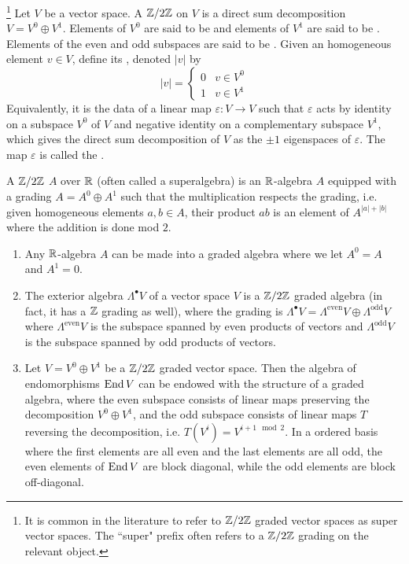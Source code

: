 \begin{defn}\footnote{It is common in the literature to refer to $\mathbb{Z}/2\mathbb{Z}$
graded vector spaces as super vector spaces. The ``super" prefix often refers
to a $\mathbb{Z}/2\mathbb{Z}$ grading on the relevant object.}
Let $V$ be a vector space. A $\mathbb{Z} /2\mathbb{Z}$  on $V$ is a direct sum
decomposition $V = V^0 \oplus V^1$. Elements of $V^0$ are said to be 
and elements of $V^1$ are said to be . Elements of the even and odd
subspaces are said to be . Given an homogeneous element
$v \in V$, define its , denoted $|v|$ by
\[
|v| = \begin{cases}
0 & v \in V^0 \\
1 & v \in V^1
\end{cases}
\]
Equivalently, it is the data of a linear map
$\varepsilon : V \to V$ such that $\varepsilon$ acts by identity on a subspace $V^0$
of $V$ and negative identity on a complementary subspace $V^1$, which gives the
direct sum decomposition of $V$ as the $\pm 1$ eigenspaces of $\varepsilon$.
The map $\varepsilon$ is called the .

\end{defn}
%
\begin{defn}
A $\mathbb{Z}/2\mathbb{Z}$  $A$ over $\mathbb{R}$ (often called a superalgebra) is
an $\mathbb{R}$-algebra $A$ equipped with a grading $A = A^0 \oplus A^1$ such that
the multiplication respects the grading, i.e. given homogeneous elements
$a,b \in A$, their product $ab$ is an element of $A^{|a| + |b|}$ where the
addition is done mod $2$.
\end{defn}
%
\begin{exmp}\enumbreak
\begin{enumerate}
  \item Any $\mathbb{R}$-algebra $A$ can be made into a graded algebra where we let
  $A^0 = A$ and $A^1 = 0$.
  \item The exterior algebra $\Lambda^\bullet V$ of a vector space $V$ is
  a $\mathbb{Z}/2\mathbb{Z}$ graded algebra (in fact, it has a $\mathbb{Z}$ grading as well), where the
  grading is
  $\Lambda^\bullet V = \Lambda^{\text{even}} V \oplus \Lambda^{\text{odd}} V$
  where $\Lambda^{\text{even}} V$ is the subspace spanned by even products of
  vectors and $\Lambda^{\text{odd}} V$ is the subspace spanned by odd products of vectors.
  \item Let $V = V^0 \oplus V^1$ be a $\mathbb{Z}/2\mathbb{Z}$ graded vector space. Then the
  algebra of endomorphisms $\operatorname{End} V$ can be endowed with the structure of a
  graded algebra, where the even subspace consists of linear maps preserving
  the decomposition $V^0 \oplus V^1$, and the odd subspace consists of
  linear maps $T$ reversing the decomposition, i.e. $T(V^i) = V^{i + 1 \mod 2}$.
  In a ordered basis where the first elements are all even and the last
  elements are all odd, the even elements of $\operatorname{End} V$ are block diagonal,
  while the odd elements are block off-diagonal.
\end{enumerate}
\end{exmp}
